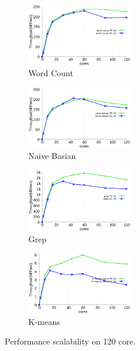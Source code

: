 \begin{figure}[tb]
    \centering
    \begin{subfigure}[b]{0.25\textwidth}
        \includegraphics[width=1.8in]{graph/wc.eps}
        \caption{Word Count}
    \end{subfigure}%
    \begin{subfigure}[b]{0.25\textwidth}
        \includegraphics[width=1.8in]{graph/nb.eps}
        \caption{Naive Basian}
    \end{subfigure}%
    \begin{subfigure}[b]{0.25\textwidth}
        \includegraphics[width=1.8in]{graph/grep.eps}
        \caption{Grep}
    \end{subfigure}%
    \begin{subfigure}[b]{0.25\textwidth}
        \includegraphics[width=1.8in]{graph/kmeans.eps}
        \caption{K-means}
    \end{subfigure}%
    \caption{Performance scalability on 120 core.}
    \label{fig:utilization}
\end{figure}




